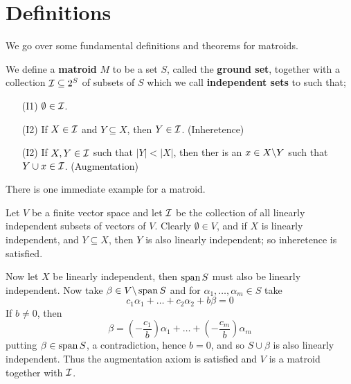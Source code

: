 
\section{Definitions}

We go over some fundamental definitions and theorems for matroids.

\begin{definition}
    We define a \textbf{matroid} $M$ to be a set $S$, called the \textbf {ground set}, together with
    a collection $\mathcal{I} \subseteq 2^S$ of subsets of  $S$ which we call \textbf {independent sets} to
    such that;
        \begin{enumerate}
            \item[(I1)] $\emptyset \in \mathcal{I}$.

            \item[(I2)] If $X \in \mathcal{I}$ and $Y \subseteq X$, then  $Y \in \mathcal{I}$. (Inheretence)

            \item[(I2)] If $X,Y \in \mathcal{I}$ such that  $|Y|<|X|$, then ther is an  $x \in X\backslash Y$ such
                that $Y \cup x \in \mathcal{I}$.  (Augmentation)
        \end{enumerate}
\end{definition}

There is one immediate example for a matroid.

\begin{example}
    Let $V$ be a finite vector space and let  $\mathcal{I}$ be the collection of all linearly independent
    subsets of vectors of  $V$. Clearly  $\emptyset \in V$, and if  $X$ is linearly independent, and
     $Y \subseteq X$, then  $Y$ is also linearly independent; so inheretence is satisfied.

     Now let $X$ be linearly independent, then  $\operatorname{span}{S}$ must also be linearly independent. Now
     take $\beta \in V\backslash\operatorname{span}{S}$ and for $\alpha_1, \dots, \alpha_m \in S$ take
        \begin{equation*}
            c_1\alpha_1+\dots+c_2\alpha_2+b\beta=0
        \end{equation*}
    If $b \neq 0$, then
        \begin{equation*}
            \beta=(-\frac{c_1}{b})\alpha_1+\dots+(-\frac{c_m}{b})\alpha_m
        \end{equation*}
    putting $\beta \in \operatorname{span}{S}$, a contradiction, hence $b=0$, and so  $S \cup \beta$ is also
    linearly independent. Thus the augmentation axiom is satisfied and  $V$ is a matroid together
    with  $\mathcal{I}$.
\end{example} 

